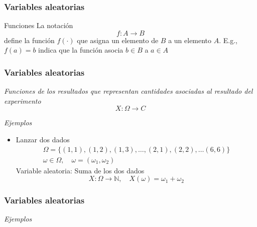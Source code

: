 \documentclass[xcolor=dvipsnames,10pt]{beamer}
\begin{document}
%
\begin{frame}
  \frametitle{Variables aleatorias}
  \begin{definicion*}{Funciones}{}
    La notación
    \begin{equation*}
      f \colon A \to B
    \end{equation*}
    define la función $f(\cdot)$ que asigna un elemento de $B$ a un elemento $A$.  E.g., $f(a) = b$ indica que la función asocia $b \in B$ a $a \in A$
  \end{definicion*}
\end{frame}
%
\begin{frame}
  \frametitle{Variables aleatorias}
  \begin{tcolorbox}
    \emph{Funciones de los resultados que representan cantidades asociadas al resultado del experimento}
    \tcblower
    \begin{equation*}
      X \colon \Omega \to C
    \end{equation*}
  \end{tcolorbox}
  \emph{Ejemplos}
  \begin{itemize}
  \item Lanzar dos dados
    \begin{gather*}
      \Omega = \{ (1, 1), (1, 2), (1, 3), \dots, (2, 1), (2, 2), \dots (6, 6) \}\\
      \omega \in \Omega, \quad \omega = (\omega_1, \omega_2)
    \end{gather*}
    Variable aleatoria: Suma de los dos dados
    \begin{equation*}
      X \colon \Omega \to \mathbb{N}, \quad X(\omega) = \omega_1 + \omega_2
    \end{equation*}
  \end{itemize}
\end{frame}
%
\begin{frame}
  \frametitle{Variables aleatorias}
  \emph{Ejemplos}
\end{frame}
\end{document}
